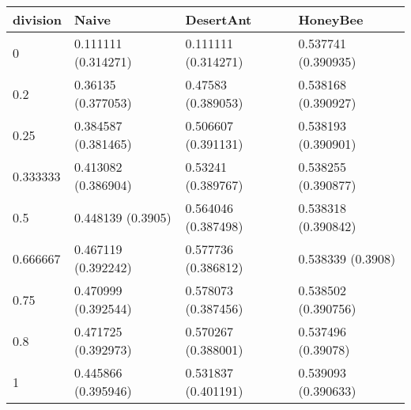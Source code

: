 \begin{tabular} {|l|l|l|l|}
\hline
division & Naive & DesertAnt & HoneyBee \\
\hline
0 & 0.111111 (0.314271)  & 0.111111 (0.314271)  & 0.537741 (0.390935)  \\
0.2 & 0.36135 (0.377053)  & 0.47583 (0.389053)  & 0.538168 (0.390927)  \\
0.25 & 0.384587 (0.381465)  & 0.506607 (0.391131)  & 0.538193 (0.390901)  \\
0.333333 & 0.413082 (0.386904)  & 0.53241 (0.389767)  & 0.538255 (0.390877)  \\
0.5 & 0.448139 (0.3905)  & 0.564046 (0.387498)  & 0.538318 (0.390842)  \\
0.666667 & 0.467119 (0.392242)  & 0.577736 (0.386812)  & 0.538339 (0.3908)  \\
0.75 & 0.470999 (0.392544)  & 0.578073 (0.387456)  & 0.538502 (0.390756)  \\
0.8 & 0.471725 (0.392973)  & 0.570267 (0.388001)  & 0.537496 (0.39078)  \\
1 & 0.445866 (0.395946)  & 0.531837 (0.401191)  & 0.539093 (0.390633)  \\
\hline
\end{tabular}
